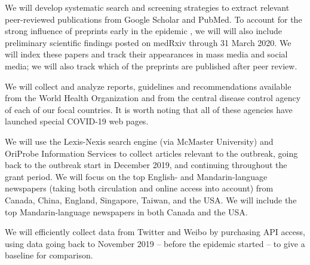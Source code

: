 




 We will develop systematic search and screening strategies to extract relevant peer-reviewed publications from Google Scholar and PubMed. To account for the strong influence of preprints early in the epidemic \cite{MajuMandPRE}, we will will also include preliminary scientific findings posted on medRxiv through 31 March 2020. We will index these papers and track their appearances in mass media and social media; we will also track which of the preprints are published after peer review.

 We will collect and analyze reports, guidelines and recommendations available from the World Health Organization and from the central disease control agency of each of our focal countries. It is worth noting that all of these agencies have launched special COVID-19 web pages.


We will use the Lexis-Nexis search engine (via McMaster University) and OriProbe Information Services to collect articles relevant to the outbreak, going back to the outbreak start in December 2019, and continuing throughout the grant period. 
We will focus on the top English- and Mandarin-language newspapers (taking both circulation and online access into account) from 
Canada, China, England, Singapore, Taiwan, and the USA.
We will include the top Mandarin-language newspapers in both Canada and the USA.

We will efficiently collect data from Twitter and Weibo by purchasing API access, using data going back to November 2019 -- before the epidemic started -- to give a baseline for comparison. 

